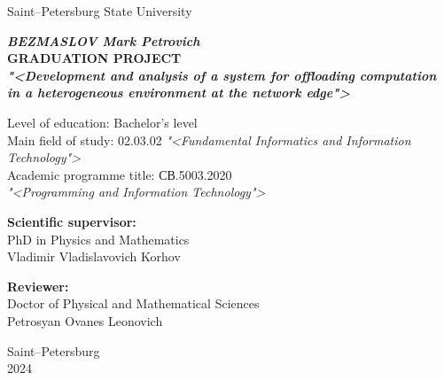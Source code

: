 \thispagestyle{empty}

\begin{center}
    Saint–Petersburg State University \\
\end{center}

    
\vfill

\begin{center}
    \textbf{ 
    \textit{BEZMASLOV Mark Petrovich} \\ 
    \vspace{20pt}
    GRADUATION PROJECT  \\  
    \vspace{20pt}
     \textit{"<Development and analysis of a system for offloading computation in a heterogeneous environment at the network edge">}
     }

    \vspace{40pt}

\end{center}

\begin{center}
\vspace{20pt}
    Level of education: Bachelor's level \\
    Main field of study: 02.03.02 
    \textit{"<Fundamental Informatics and Information Technology">} \\
    Academic programme title: СВ.5003.2020 \\
    \textit{"<Programming and Information Technology">}
\end{center}

\vfill

\begin{flushright}

    \noindent \textbf{Scientific supervisor:} \\ PhD in Physics and Mathematics \\ Vladimir Vladislavovich Korhov \\ 

    \vspace{20pt}
    
    \noindent \textbf{Reviewer:} \\ Doctor of Physical and Mathematical Sciences \\ Petrosyan Ovanes Leonovich \\
\end{flushright}

\vfill


\begin{center}
    Saint–Petersburg \\ 2024
\end{center}